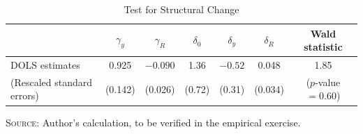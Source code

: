 \begin{table}[htbp]
\centering
\caption{Test for Structural Change}
\label{tab:10.4}
\begin{tabular}{l ccccc c}
\toprule
 & $\gamma_y$ & $\gamma_R$ & $\delta_0$ & $\delta_y$ & $\delta_R$
 & Wald statistic \\
\midrule
DOLS estimates
  & 0.925 & $-0.090$ & 1.36 & $-0.52$ & 0.048 & 1.85 \\
(Rescaled standard errors)
  & (0.142) & (0.026) & (0.72) & (0.31) & (0.034)
  & ($p$-value $= 0.60$) \\
\bottomrule
\end{tabular}

\medskip
\small
\textsc{Source:} Author's calculation, to be verified in the empirical exercise.
\end{table}
